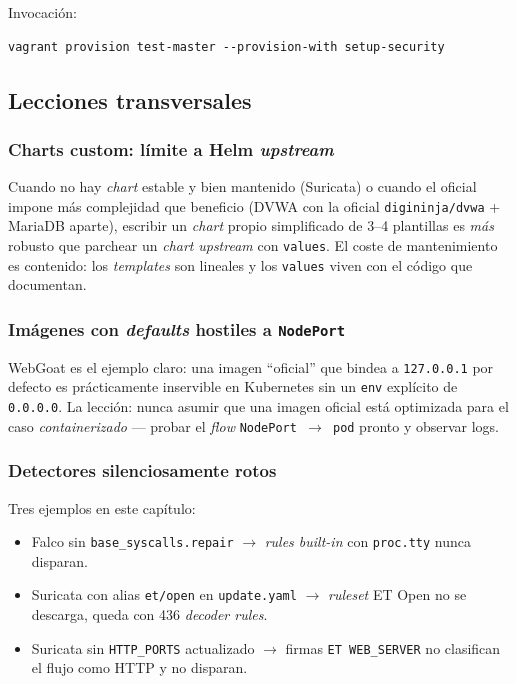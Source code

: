 Invocación:

\begin{lstlisting}[style=bash]
vagrant provision test-master --provision-with setup-security
\end{lstlisting}

\subsection{Lecciones transversales}

\subsubsection{Charts custom: límite a Helm \emph{upstream}}

Cuando no hay \emph{chart} estable y bien mantenido (Suricata) o cuando el oficial impone más complejidad que beneficio (DVWA con la oficial \texttt{digininja/dvwa} + MariaDB aparte), escribir un \emph{chart} propio simplificado de 3--4 plantillas es \emph{más} robusto que parchear un \emph{chart} \emph{upstream} con \texttt{values}. El coste de mantenimiento es contenido: los \emph{templates} son lineales y los \texttt{values} viven con el código que documentan.

\subsubsection{Imágenes con \emph{defaults} hostiles a \texttt{NodePort}}

WebGoat es el ejemplo claro: una imagen ``oficial'' que bindea a \texttt{127.0.0.1} por defecto es prácticamente inservible en Kubernetes sin un \texttt{env} explícito de \texttt{0.0.0.0}. La lección: nunca asumir que una imagen oficial está optimizada para el caso \emph{containerizado} --- probar el \emph{flow} \texttt{NodePort $\to$ pod} pronto y observar logs.

\subsubsection{Detectores silenciosamente rotos}

Tres ejemplos en este capítulo:
\begin{itemize}
  \item Falco sin \texttt{base\_syscalls.repair} $\to$ \emph{rules built-in} con \texttt{proc.tty} nunca disparan.
  \item Suricata con alias \texttt{et/open} en \texttt{update.yaml} $\to$ \emph{ruleset} ET Open no se descarga, queda con 436 \emph{decoder rules}.
  \item Suricata sin \texttt{HTTP\_PORTS} actualizado $\to$ firmas \texttt{ET WEB\_SERVER} no clasifican el flujo como HTTP y no disparan.
\end{itemize}

